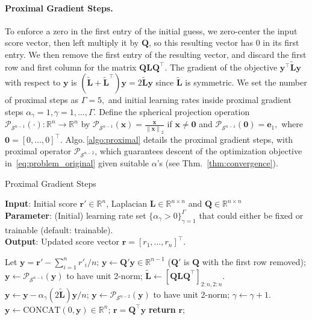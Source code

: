 \documentclass[nohyperref]{article}
\theoremstyle{plain}
\theoremstyle{definition}
\theoremstyle{remark}
\begin{document}
\paragraph{Proximal Gradient Steps.}  
To enforce a zero in the first entry of the initial guess, we
zero-center the input score vector, then left multiply it by $\mathbf{Q}$, so this resulting vector has 0 in its first entry. We then remove the first entry of the resulting vector, and discard the first row and first column for the matrix $\mathbf{Q L Q^\top}$. The gradient of the objective $\mathbf{y^\top}\widetilde{\mathbf{L}}\mathbf{y}$ with respect to $\mathbf{y}$ is $(\widetilde{\mathbf{L}} + \widetilde{\mathbf{L}}^\top)\mathbf{y}=2\widetilde{\mathbf{L}}\mathbf{y}$ since $\widetilde{\mathbf{L}}$ is symmetric. We set the 
number of proximal steps as $\Gamma=5,$ and initial learning rates inside proximal gradient steps $\alpha_\gamma = 1, \gamma=1, \ldots, \Gamma$.
Define the spherical projection operation $\mathcal{P}_{\mathcal{S}^{n-1}}(\cdot):\mathbb{R}^n\rightarrow\mathbb{R}^n$ by $\mathcal{P}_{\mathcal{S}^{n-1}}(\mathbf{x})=\frac{\mathbf{x}}{\left\lVert \mathbf{x} \right\rVert_2}$ if $\mathbf{x}\neq \mathbf{0}$ and $\mathcal{P}_{\mathcal{S}^{n-1}}(\mathbf{0})=\mathbf{e}_1,$ where $\mathbf{0}=[0,\dots,0]^\top.$ Algo.\,\ref{algo:proximal} details the proximal gradient steps, with proximal operator $\mathcal{P}_{\mathcal{S}^{n-2}}$, which guarantees descent of the optimization objective in~\eqref{eq:problem_original} given suitable $\alpha$'s (see Thm.~\ref{thm:convergence}).
\begin{algorithm}[tb!]
\begin{small}
\caption{Proximal Gradient Steps}
\label{alg:algorithmprox}
\textbf{Input}: Initial score $\mathbf{r'}\in\mathbb{R}^n$, Laplacian $\mathbf{L}\in\mathbb{R}^{n\times n}$ and $\mathbf{Q}\in\mathbb{R}^{n\times n}$\\
\textbf{Parameter}: (Initial) learning rate set $\{\alpha_\gamma>0\}_{\gamma=1}^\Gamma$ that could either be fixed or trainable (default: trainable).\\
\textbf{Output}: Updated score vector $\mathbf{r}=[r_1, \dots, r_n]^\top$. 

\begin{algorithmic}[1] 
\STATE Let $\mathbf{y}= \mathbf{r'} - \sum_{i=1}^n r'_i/n$;
\STATE $\mathbf{y} \leftarrow \mathbf{Q}'\mathbf{y} \in \mathbb{R}^{n-1}$ ($\mathbf{Q}'$ is $\mathbf{Q}$ with the first row removed);
\STATE $\mathbf{y} \leftarrow \mathcal{P}_{\mathcal{S}^{n-1}}(\mathbf{y})$ to have unit 2-norm;
\STATE $ \widetilde{\mathbf{L}} \leftarrow \left[\mathbf{Q L Q}^\top\right]_{2:n,2:n}.$
\FOR{$\gamma < \Gamma$}
\STATE $\mathbf{y} \leftarrow \mathbf{y} - \alpha_\gamma (2\widetilde{\mathbf{L}})\mathbf{y}/n$; 
\STATE $\mathbf{y} \leftarrow \mathcal{P}_{\mathcal{S}^{n-2}}(\mathbf{y})$ to have unit 2-norm;
\STATE $\gamma \leftarrow  \gamma + 1.$
\ENDFOR
\STATE $\mathbf{y} \leftarrow \text{CONCAT}(0, \mathbf{y})\in\mathbb{R}^n$;
\STATE $\mathbf{r} = \mathbf{Q}^\top \mathbf{y}$
\STATE \textbf{return} $\mathbf{r}$;
\end{algorithmic}
\label{algo:proximal}
\end{small}
\end{algorithm}
\end{document}

